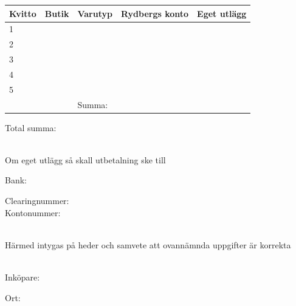 \documentclass[12pt]{article}
\begin{document}
\begin{table}[H]
    \doublespacing
    \centering
    \begin{tabular}{lp{30mm}|p{30mm}|l|l|}
    \hline
    \multicolumn{1}{|l|}{Kvitto} & Butik & Varutyp & Rydbergs konto & Eget utlägg \\ \hline
    \multicolumn{1}{|l|}{1}      &       &         &                &             \\ \hline
    \multicolumn{1}{|l|}{2}      &       &         &                &             \\ \hline
    \multicolumn{1}{|l|}{3}      &       &         &                &             \\ \hline
    \multicolumn{1}{|l|}{4}      &       &         &                &             \\ \hline
    \multicolumn{1}{|l|}{5}      &       &         &                &             \\ \hline
                                 &       & Summa:  &                &             \\ \cline{3-5} 
    \end{tabular}
\end{table}
\hfill
\begin{minipage}[H]{0.4\textwidth}
    Total summa: \hrulefill
\end{minipage}
\hspace*{34mm}
\vspace*{5mm}\\
Om eget utlägg så skall utbetalning ske till\\[5mm]
\begin{minipage}[H]{0.49\textwidth}
    \doublespacing
    Bank: \hrulefill\\
\end{minipage}
\hfill
\begin{minipage}[H]{0.49\textwidth}
    \doublespacing
    Clearingnummer: \hrulefill\\
    Kontonummer: \hrulefill
\end{minipage}
\vspace*{10mm}\\
Härmed intygas på heder och samvete att ovannämnda uppgifter är korrekta\\
\vspace*{2mm}\\
\begin{minipage}[H]{65mm}
    Inköpare: \hrulefill
\end{minipage}
\begin{minipage}[H]{30mm}
    Ort: \hrulefill
\end{minipage}
\end{document}
